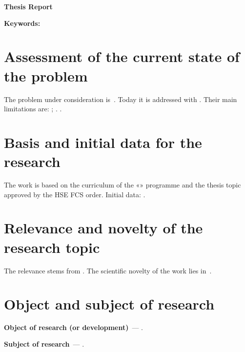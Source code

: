 \documentclass[12pt,a4paper]{extarticle}
\begin{document}
\sloppy



\begin{center}
  \textbf{\large Thesis Report}
\end{center}

\vspace{0.4em}

\noindent\textbf{Keywords:} 

\section{Assessment of the current state of the problem}
The problem under consideration is~. Today it is addressed with  \cite{example-en}. Their main limitations are: ; . .

\section{Basis and initial data for the research}
The work is based on the curriculum of the «\hseSpecialization» programme and the thesis topic approved by the HSE FCS order. Initial data: .

\section{Relevance and novelty of the research topic}
The relevance stems from . The scientific novelty of the work lies in~.

\section{Object and subject of research}
\textbf{Object of research (or development)}~--- .

\textbf{Subject of research}~--- .
\end{document}
